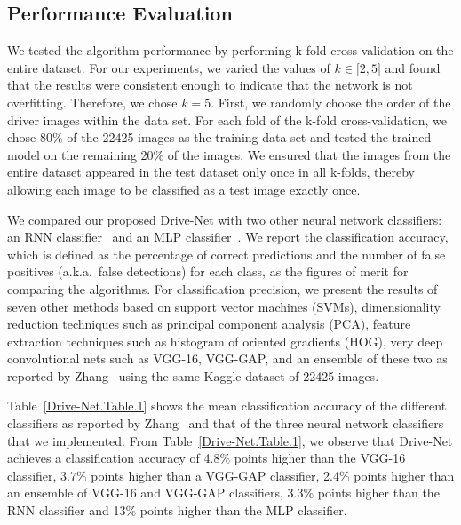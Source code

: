 \subsection{Performance Evaluation} We tested the algorithm performance by performing k-fold cross-validation on the entire dataset. For our experiments, we varied the values of $k\in\lbrack2, 5 \rbrack $ and found that the results were consistent enough to indicate that the network is not overfitting. Therefore, we chose $k = 5 $. First, we randomly choose the order of the driver images within the data set. For each fold of the k-fold cross-validation, we chose 80\% of the 22425 images as the training data set and tested the trained model on the remaining 20\% of the images. We ensured that the images from the entire dataset appeared in the test dataset only once in all k-folds, thereby allowing each image to be classified as a test image exactly once.

We compared our proposed Drive-Net with two other neural network classifiers: an RNN classifier~\cite{liang_Recurrent_2015} and an MLP classifier~\cite{haykin_Neural_2009}. We report the classification accuracy, which is defined as the percentage of correct predictions and the number of false positives (a.k.a.\ false detections) for each class, as the figures of merit for comparing the algorithms. For classification precision, we present the results of seven other methods based on support vector machines (SVMs), dimensionality reduction techniques such as principal component analysis (PCA), feature extraction techniques such as histogram of oriented gradients (HOG), very deep convolutional nets such as VGG-16, VGG-GAP, and an ensemble of these two as reported by Zhang~\cite{zhang_Apply_2016} using the same Kaggle dataset of 22425 images.

Table~\ref{Drive-Net.Table.1} shows the mean classification accuracy of the different classifiers as reported by Zhang~\cite{zhang_Apply_2016} and that of the three neural network classifiers that we implemented. From Table~\ref{Drive-Net.Table.1}, we observe that Drive-Net achieves a classification accuracy of 4.8\% points higher than the VGG-16 classifier, $3.7\% $ points higher than a VGG-GAP classifier, 2.4\% points higher than an ensemble of VGG-16 and VGG-GAP classifiers, 3.3\% points higher than the RNN classifier and 13\% points higher than the MLP classifier.


